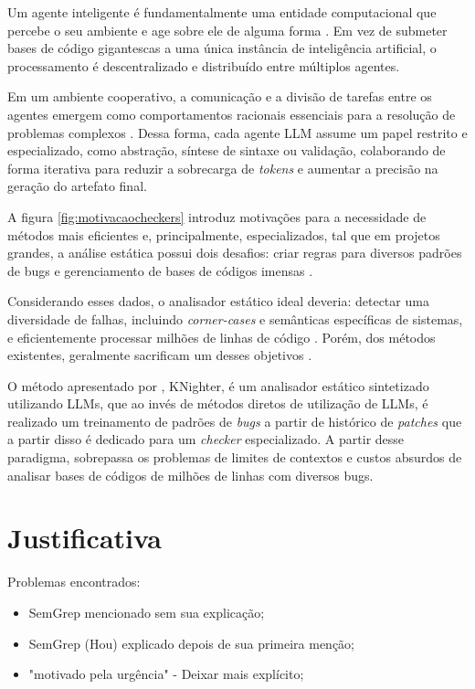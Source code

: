 \documentclass[
    12pt,                %
    openright,           %
    oneside,             %
    a4paper,             %
    english,             %
    brazil               %
]{abntex2}
\begin{document}
\begin{itemize}
Um agente inteligente é fundamentalmente uma entidade computacional que percebe o seu ambiente e age sobre ele de alguma forma \cite{russell2020artificial}.
Em vez de submeter bases de código gigantescas a uma única instância de inteligência artificial, o processamento é descentralizado e distribuído entre múltiplos agentes.
\par
Em um ambiente cooperativo, a comunicação e a divisão de tarefas entre os agentes emergem como comportamentos racionais essenciais para a resolução de problemas complexos \cite{russell2020artificial}.
Dessa forma, cada agente LLM assume um papel restrito e especializado, como abstração, síntese de sintaxe ou validação, colaborando de forma iterativa para reduzir a sobrecarga de \textit{tokens} e aumentar a precisão na geração do artefato final.
\par
A figura \ref{fig:motivacaocheckers} introduz motivações para a necessidade de métodos mais eficientes e, principalmente, especializados, tal que em projetos grandes, a análise estática possui dois desafios: criar regras para diversos padrões de bugs e gerenciamento de bases de códigos imensas \cite{yang2025knighter}.
\par
Considerando esses dados, o analisador estático ideal deveria: detectar uma diversidade de falhas, incluindo \textit{corner-cases} e semânticas específicas de sistemas, e eficientemente processar milhões de linhas de código \cite{yang2025knighter}.
Porém, dos métodos existentes, geralmente sacrificam um desses objetivos \cite{yang2025knighter}.
\par
O método apresentado por , KNighter, é um analisador estático sintetizado utilizando LLMs, que ao invés de métodos diretos de utilização de LLMs, é realizado um treinamento de padrões de \textit{bugs} a partir de histórico de \textit{patches} que a partir disso é dedicado para um \textit{checker} especializado.
A partir desse paradigma,  sobrepassa os problemas de limites de contextos e custos absurdos de analisar bases de códigos de milhões de linhas com diversos bugs.

\section{Justificativa}
\label{sec:justificativa}

\par
Problemas encontrados:

\begin{itemize}
  \item SemGrep mencionado sem sua explicação;
  \item SemGrep (Hou) explicado depois de sua primeira menção;
  \item "motivado pela urgência" - Deixar mais explícito;
\end{itemize}


\end{itemize}
\end{document}
